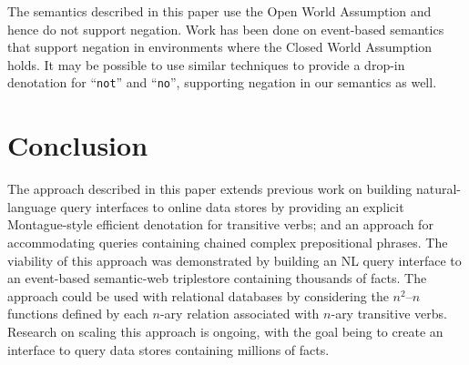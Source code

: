 \documentclass[../main.tex]{subfiles}
\begin{document}
\begin{refsection}
The semantics described in this paper use the Open World Assumption and hence do not support negation.  Work has been done on event-based semantics that support negation \cite{champollion2010quantification} in environments where the Closed World Assumption holds. It may be possible to use similar techniques to provide a drop-in denotation for ``\texttt{not}'' and ``\texttt{no}'', supporting negation in our semantics as well.


\section{Conclusion}
The approach described in this paper extends previous work on building natural-language query interfaces to online data stores by providing an explicit Montague-style efficient denotation for transitive verbs; and an approach for accommodating queries containing chained complex prepositional phrases. The viability of this approach was demonstrated by building an NL query interface to an event-based semantic-web triplestore containing thousands of facts. The approach could be used with relational databases by considering the $n^2 – n$ functions defined by each $n$-ary relation associated with $n$-ary transitive verbs. Research on scaling this approach is ongoing, with the goal being to create an interface to query data stores containing millions of facts.






%



\end{refsection}
\end{document}

